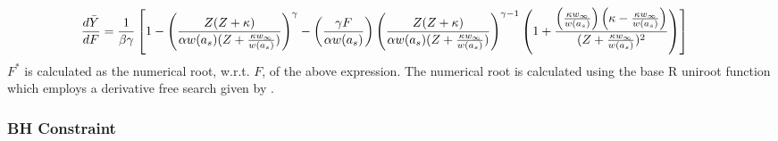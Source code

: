 \begingroup
\scriptsize
\begin{align}
\frac{d \bar{Y}}{dF} &= \frac{1}{\beta\gamma}\left[ 1 - \one - \two \left( 1 + \thr \right) \right]\label{dBdFS}
\end{align}
\endgroup
%
$F^*$ is calculated as the numerical root, w.r.t. $F$, of the above expression.
The numerical root is calculated using the base R uniroot function which
employs a derivative free search given by \cite{brent_chapter_1973}. %

%
\subsubsection{BH Constraint}

